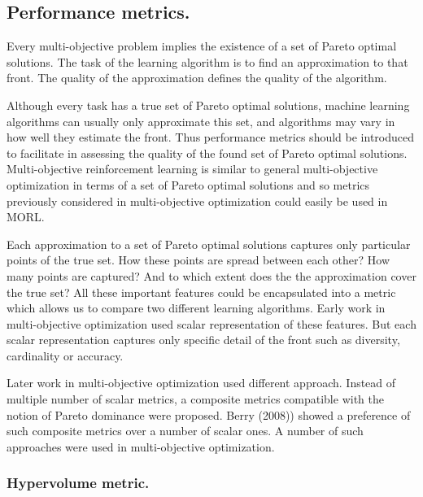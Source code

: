 \subsection{Performance metrics.}

Every multi-objective problem implies the existence of a set of Pareto optimal solutions. The task of the learning algorithm is to find an approximation to that front. The quality of the approximation defines the quality of the algorithm.

Although every task has a true set of Pareto optimal solutions, machine learning algorithms can usually only approximate this set, and algorithms may vary in how well they estimate the front. Thus performance metrics should be introduced to facilitate in assessing the quality of the found set of Pareto optimal solutions.  Multi-objective reinforcement learning is similar to general multi-objective optimization in terms of a set of Pareto optimal solutions and so metrics previously considered in multi-objective optimization could easily be used in MORL.

Each approximation to a set of Pareto optimal solutions captures only particular points of the true set. How these points are spread between each other? How many points are captured? And to which extent does the the approximation cover the true set? All these important features could be encapsulated into a metric which allows us to compare two different learning algorithms. Early work in multi-objective optimization used scalar representation of these features. But each scalar representation captures only specific detail of the front such as diversity, cardinality or accuracy.

Later work in multi-objective optimization used different approach. Instead of multiple number of scalar metrics, a composite metrics compatible with the notion of Pareto dominance were proposed. Berry (2008)\nocite{berry2008phd}) showed a preference of such composite metrics over a number of scalar ones. A number of such approaches were used in multi-objective optimization.

\subsubsection{Hypervolume metric.}

